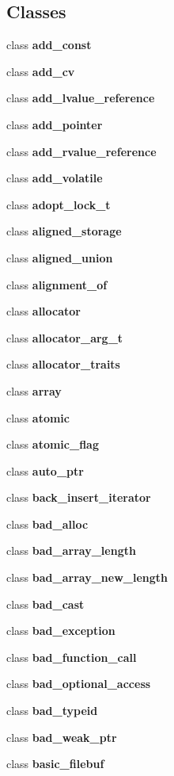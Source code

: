 \subsection*{Classes}
\begin{DoxyCompactItemize}
\item 
class \textbf{ add\+\_\+const}
\item 
class \textbf{ add\+\_\+cv}
\item 
class \textbf{ add\+\_\+lvalue\+\_\+reference}
\item 
class \textbf{ add\+\_\+pointer}
\item 
class \textbf{ add\+\_\+rvalue\+\_\+reference}
\item 
class \textbf{ add\+\_\+volatile}
\item 
class \textbf{ adopt\+\_\+lock\+\_\+t}
\item 
class \textbf{ aligned\+\_\+storage}
\item 
class \textbf{ aligned\+\_\+union}
\item 
class \textbf{ alignment\+\_\+of}
\item 
class \textbf{ allocator}
\item 
class \textbf{ allocator\+\_\+arg\+\_\+t}
\item 
class \textbf{ allocator\+\_\+traits}
\item 
class \textbf{ array}
\item 
class \textbf{ atomic}
\item 
class \textbf{ atomic\+\_\+flag}
\item 
class \textbf{ auto\+\_\+ptr}
\item 
class \textbf{ back\+\_\+insert\+\_\+iterator}
\item 
class \textbf{ bad\+\_\+alloc}
\item 
class \textbf{ bad\+\_\+array\+\_\+length}
\item 
class \textbf{ bad\+\_\+array\+\_\+new\+\_\+length}
\item 
class \textbf{ bad\+\_\+cast}
\item 
class \textbf{ bad\+\_\+exception}
\item 
class \textbf{ bad\+\_\+function\+\_\+call}
\item 
class \textbf{ bad\+\_\+optional\+\_\+access}
\item 
class \textbf{ bad\+\_\+typeid}
\item 
class \textbf{ bad\+\_\+weak\+\_\+ptr}
\item 
class \textbf{ basic\+\_\+filebuf}
\item 

\end{DoxyCompactItemize}
